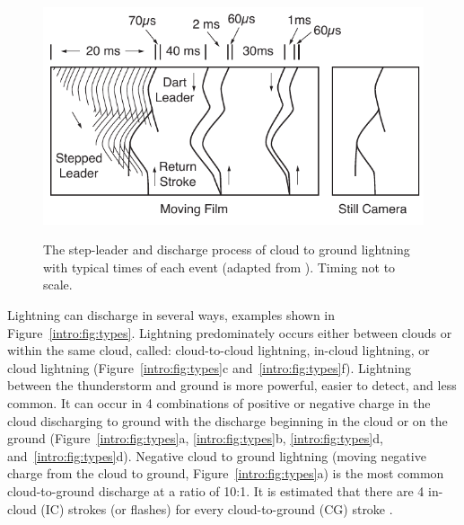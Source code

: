 \begin{figure}[ht!]
	\centering
	\includegraphics[scale=1]{Introduction/Figures/Lightning_Evolution.pdf}\\
	\caption{The step-leader and discharge process of cloud to ground lightning with typical times of each event (adapted from \citet{Uman1969}). Timing not to scale.}
	\label{intro:fig:evolution}
\end{figure}

Lightning can discharge in several ways, examples shown in Figure~\ref{intro:fig:types}.
Lightning predominately occurs either between clouds or within the same cloud, called: cloud-to-cloud lightning, in-cloud lightning, or cloud lightning (Figure~\ref{intro:fig:types}c and~\ref{intro:fig:types}f).
Lightning between the thunderstorm and ground is more powerful, easier to detect, and less common.
It can occur in 4 combinations of positive or negative charge in the cloud discharging to ground with the discharge beginning in the cloud or on the ground (Figure~\ref{intro:fig:types}a, \ref{intro:fig:types}b, \ref{intro:fig:types}d, and~\ref{intro:fig:types}d).
Negative cloud to ground lightning (moving negative charge from the cloud to ground, Figure~\ref{intro:fig:types}a) is the most common cloud-to-ground discharge at a ratio of 10:1.
It is estimated that there are 4 in-cloud (IC) strokes (or flashes) for every cloud-to-ground (CG) stroke \citep{Uman1969}.


